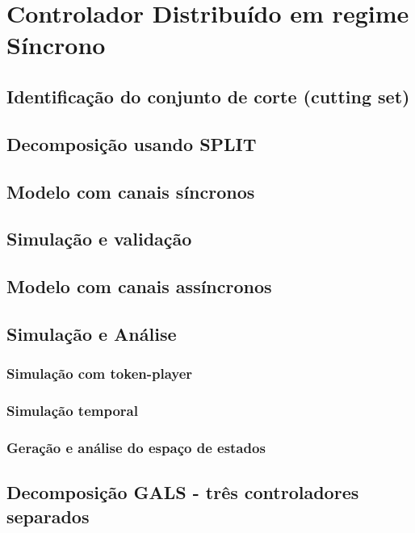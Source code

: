 \section{Controlador Distribuído em regime Síncrono}

\subsection{Identificação do conjunto de corte (cutting set)}

\subsection{Decomposição usando SPLIT}

\subsection{Modelo com canais síncronos}

\subsection{Simulação e validação}

\subsection{Modelo com canais assíncronos}

\subsection{Simulação e Análise}

\subsubsection{Simulação com token-player}

\subsubsection{Simulação temporal}

\subsubsection{Geração e análise do espaço de estados}

\subsection{Decomposição GALS - três controladores separados}
